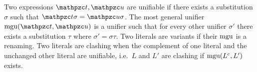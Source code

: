 
\begin{definition}\label{def:unifier}
Two expressions $\mct, \mcu$ are {\myem unifiable} if there exists a substitution $\sigma$ such that $\mct\sigma=\mcu\sigma$.
The {\myem most general unifier} $\mgu(\mct,\mcu)$ is a unifier such that
for every other unifier $\sigma'$ there exists a substitution $\tau$ where
$\sigma' = \sigma \tau$. 
Two literals are variants if their $\operatorname{mgu}$ is a renaming.
Two literals are {\myem clashing} when the complement of one literal 
and the unchanged other literal are unifiable, i.e.~$L$ and $L'$ are clashing if $\operatorname{mgu}(L^c, L')$ exists.
\end{definition}
